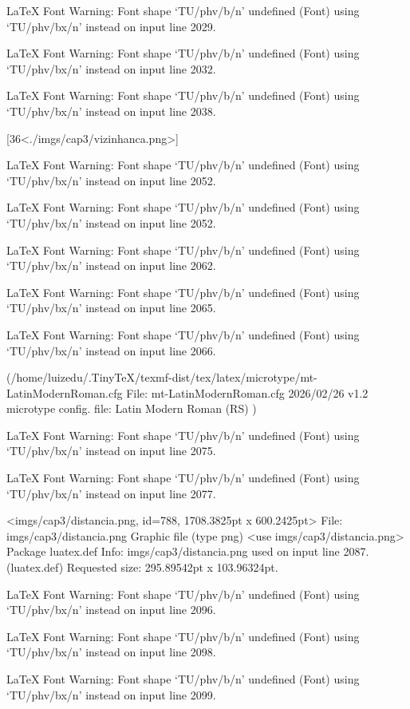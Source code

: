 LaTeX Font Warning: Font shape `TU/phv/b/n' undefined
(Font)              using `TU/phv/bx/n' instead on input line 2029.


LaTeX Font Warning: Font shape `TU/phv/b/n' undefined
(Font)              using `TU/phv/bx/n' instead on input line 2032.


LaTeX Font Warning: Font shape `TU/phv/b/n' undefined
(Font)              using `TU/phv/bx/n' instead on input line 2038.

[36<./imgs/cap3/vizinhanca.png>]

LaTeX Font Warning: Font shape `TU/phv/b/n' undefined
(Font)              using `TU/phv/bx/n' instead on input line 2052.


LaTeX Font Warning: Font shape `TU/phv/b/n' undefined
(Font)              using `TU/phv/bx/n' instead on input line 2052.


LaTeX Font Warning: Font shape `TU/phv/b/n' undefined
(Font)              using `TU/phv/bx/n' instead on input line 2062.


LaTeX Font Warning: Font shape `TU/phv/b/n' undefined
(Font)              using `TU/phv/bx/n' instead on input line 2065.


LaTeX Font Warning: Font shape `TU/phv/b/n' undefined
(Font)              using `TU/phv/bx/n' instead on input line 2066.

(/home/luizedu/.TinyTeX/texmf-dist/tex/latex/microtype/mt-LatinModernRoman.cfg
File: mt-LatinModernRoman.cfg 2026/02/26 v1.2 microtype config. file: Latin Modern Roman (RS)
)

LaTeX Font Warning: Font shape `TU/phv/b/n' undefined
(Font)              using `TU/phv/bx/n' instead on input line 2075.


LaTeX Font Warning: Font shape `TU/phv/b/n' undefined
(Font)              using `TU/phv/bx/n' instead on input line 2077.

<imgs/cap3/distancia.png, id=788, 1708.3825pt x 600.2425pt>
File: imgs/cap3/distancia.png Graphic file (type png)
<use imgs/cap3/distancia.png>
Package luatex.def Info: imgs/cap3/distancia.png  used on input line 2087.
(luatex.def)             Requested size: 295.89542pt x 103.96324pt.

LaTeX Font Warning: Font shape `TU/phv/b/n' undefined
(Font)              using `TU/phv/bx/n' instead on input line 2096.


LaTeX Font Warning: Font shape `TU/phv/b/n' undefined
(Font)              using `TU/phv/bx/n' instead on input line 2098.


LaTeX Font Warning: Font shape `TU/phv/b/n' undefined
(Font)              using `TU/phv/bx/n' instead on input line 2099.


